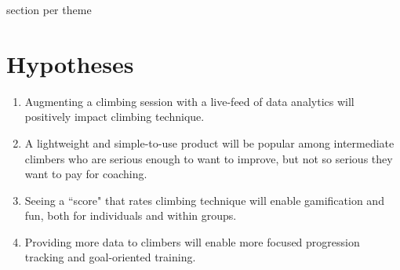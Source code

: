 section per theme



\section{Hypotheses}


\begin{enumerate}
    \item Augmenting a climbing session with a live-feed of data analytics will positively impact climbing technique.
    \item A lightweight and simple-to-use product will be popular among intermediate climbers who are serious enough to want to improve, but not so serious they want to pay for coaching.
    \item Seeing a ``score" that rates climbing technique will enable gamification and fun, both for individuals and within groups.
    \item Providing more data to climbers will enable more focused progression tracking and goal-oriented training.
\end{enumerate}
